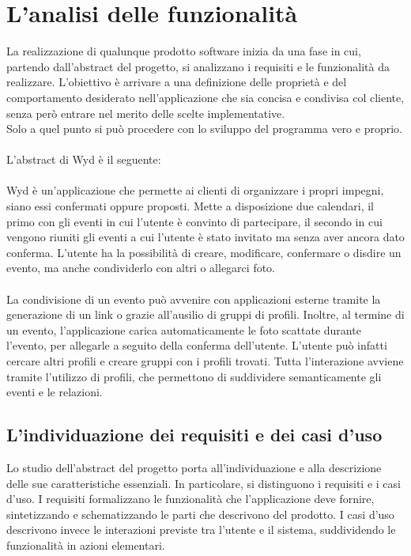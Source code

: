 \chapter{L'analisi delle funzionalità}

La realizzazione di qualunque prodotto software inizia da una fase in cui,
partendo dall’abstract del progetto, si analizzano i requisiti e le funzionalità da realizzare.
L’obiettivo è arrivare a una definizione delle proprietà e
del comportamento desiderato nell’applicazione che sia concisa e condivisa col cliente,
senza però entrare nel merito delle scelte implementative.\\
Solo a quel punto si può procedere con lo sviluppo del programma vero e proprio.\\
\\
L'abstract di Wyd è il seguente:\\
\\
Wyd è un'applicazione che permette ai clienti di organizzare i propri impegni,
siano essi confermati oppure proposti.
Mette a disposizione due calendari,
il primo con gli eventi in cui l'utente è convinto di partecipare,
il secondo in cui vengono riuniti gli eventi a cui l'utente è stato invitato ma senza aver ancora dato conferma.
L'utente ha la possibilità di creare, modificare, confermare o disdire un evento,
ma anche condividerlo con altri o allegarci foto.\\
\\
La condivisione di un evento può avvenire con applicazioni esterne tramite la generazione di un link o
grazie all'ausilio di gruppi di profili.
Inoltre, al termine di un evento, l'applicazione carica automaticamente le foto scattate
durante l'evento, per allegarle a seguito della conferma dell'utente.
L'utente può infatti cercare altri profili e creare gruppi con i profili trovati.
Tutta l'interazione avviene tramite l'utilizzo di profili,
che permettono di suddividere semanticamente gli eventi e le relazioni.
\clearpage

\section{L'individuazione dei requisiti e dei casi d’uso}

Lo studio dell’abstract del progetto porta all’individuazione e
alla descrizione delle sue caratteristiche essenziali.
In particolare, si distinguono i requisiti e i casi d'uso.
I requisiti formalizzano le funzionalità che l'applicazione deve fornire,
sintetizzando e schematizzando le parti che descrivono del prodotto.
I casi d'uso descrivono invece le interazioni previste tra l'utente e il sistema,
suddividendo le funzionalità in azioni elementari.\\

